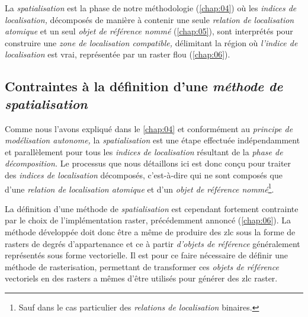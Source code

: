 La \emph{spatialisation} est la phase de notre méthodologie
(\autoref{chap:04}) où les \emph{indices de localisation,} décomposés
de manière à contenir une seule \emph{relation de localisation
  atomique} et un seul \emph{objet de référence nommé}
(\autoref{chap:05}), sont interprétés pour construire une \emph{zone
  de localisation compatible,} délimitant la région où \emph{l'indice
  de localisation} est vrai, représentée par un raster flou
(\autoref{chap:06}).

\subsection{Contraintes à la définition d'une \emph{méthode de spatialisation}}

Comme nous l'avons expliqué dans le \autoref{chap:04} et conformément
au \emph{principe de modélisation autonome,} la \emph{spatialisation}
est une étape effectuée indépendamment et parallèlement pour tous les
\emph{indices de localisation} résultant de la \emph{phase de
  décomposition.} Le processus que nous détaillons ici est donc conçu
pour traiter des \emph{indices de localisation} décomposés,
c'est-à-dire qui ne sont composés que d'une \emph{relation de
  localisation atomique} et d'un \emph{objet de référence
  nommé}\footnote{Sauf dans le cas particulier des \emph{relations de
    localisation} binaires.}.

La définition d'une méthode de \emph{spatialisation} est cependant
fortement contrainte par le choix de l'implémentation raster,
précédemment annoncé (\autoref{chap:06}). La méthode développée doit
donc être a même de produire des \ac{zlc} sous la forme de rasters de
degrés d'appartenance et ce à partir \emph{d'objets de référence}
généralement représentés sous forme vectorielle. Il est pour ce faire
nécessaire de définir une méthode de rasterisation, permettant de
transformer ces \emph{objets de référence} vectoriels en des rasters a
mêmes d'être utilisés pour générer des \ac{zlc} raster.

